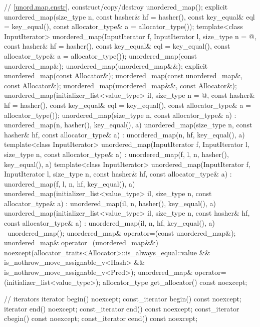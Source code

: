 \begin{codeblock}
{{    // \ref{unord.map.cnstr}, construct/copy/destroy
    unordered_map();
    explicit unordered_map(size_type n,
                           const hasher& hf = hasher(),
                           const key_equal& eql = key_equal(),
                           const allocator_type& a = allocator_type());
    template<class InputIterator>
      unordered_map(InputIterator f, InputIterator l,
                    size_type n = @\seebelow@,
                    const hasher& hf = hasher(),
                    const key_equal& eql = key_equal(),
                    const allocator_type& a = allocator_type());
    unordered_map(const unordered_map&);
    unordered_map(unordered_map&&);
    explicit unordered_map(const Allocator&);
    unordered_map(const unordered_map&, const Allocator&);
    unordered_map(unordered_map&&, const Allocator&);
    unordered_map(initializer_list<value_type> il,
                  size_type n = @\seebelow@,
                  const hasher& hf = hasher(),
                  const key_equal& eql = key_equal(),
                  const allocator_type& a = allocator_type());
    unordered_map(size_type n, const allocator_type& a)
      : unordered_map(n, hasher(), key_equal(), a) { }
    unordered_map(size_type n, const hasher& hf, const allocator_type& a)
      : unordered_map(n, hf, key_equal(), a) { }
    template<class InputIterator>
      unordered_map(InputIterator f, InputIterator l, size_type n, const allocator_type& a)
        : unordered_map(f, l, n, hasher(), key_equal(), a) { }
    template<class InputIterator>
      unordered_map(InputIterator f, InputIterator l, size_type n, const hasher& hf,
                    const allocator_type& a)
        : unordered_map(f, l, n, hf, key_equal(), a) { }
    unordered_map(initializer_list<value_type> il, size_type n, const allocator_type& a)
      : unordered_map(il, n, hasher(), key_equal(), a) { }
    unordered_map(initializer_list<value_type> il, size_type n, const hasher& hf,
                  const allocator_type& a)
      : unordered_map(il, n, hf, key_equal(), a) { }
    ~unordered_map();
    unordered_map& operator=(const unordered_map&);
    unordered_map& operator=(unordered_map&&)
      noexcept(allocator_traits<Allocator>::is_always_equal::value &&
               is_nothrow_move_assignable_v<Hash> &&
               is_nothrow_move_assignable_v<Pred>);
    unordered_map& operator=(initializer_list<value_type>);
    allocator_type get_allocator() const noexcept;

    // iterators
    iterator       begin() noexcept;
    const_iterator begin() const noexcept;
    iterator       end() noexcept;
    const_iterator end() const noexcept;
    const_iterator cbegin() const noexcept;
    const_iterator cend() const noexcept;

}}
\end{codeblock}
